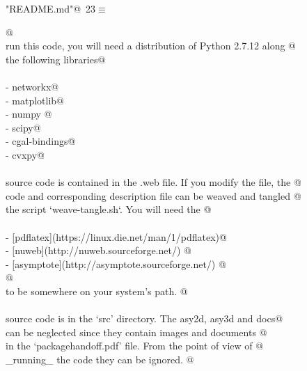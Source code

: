 \documentclass[10pt, english, oneside]{report}
\begin{document}
\begin{appendices}
\begin{flushleft} \small\label{scrap22}\raggedright\small
{} \verb@"README.md"@\nobreak\ {\footnotesize {23}}$\equiv$
\vspace{-1ex}
\begin{list}{}{} \item
\mbox{}\verb@    @\\
\mbox{}\verb@To run this code, you will need a distribution of Python 2.7.12 along @\\
\mbox{}\verb@with the following libraries@\\
\mbox{}\verb@@\\
\mbox{}\verb@- networkx@\\
\mbox{}\verb@- matplotlib@\\
\mbox{}\verb@- numpy @\\
\mbox{}\verb@- scipy@\\
\mbox{}\verb@- cgal-bindings@\\
\mbox{}\verb@- cvxpy@\\
\mbox{}\verb@@\\
\mbox{}\verb@All source code is contained in the .web file. If you modify the file, the @\\
\mbox{}\verb@resulting code and corresponding description file can be weaved and tangled @\\
\mbox{}\verb@with the script `weave-tangle.sh`. You will need the @\\
\mbox{}\verb@@\\
\mbox{}\verb@- [pdflatex](https://linux.die.net/man/1/pdflatex)@\\
\mbox{}\verb@- [nuweb](http://nuweb.sourceforge.net/) @\\
\mbox{}\verb@- [asymptote](http://asymptote.sourceforge.net/) @\\
\mbox{}\verb@  @\\
\mbox{}\verb@executables to be somewhere on your system's path. @\\
\mbox{}\verb@@\\
\mbox{}\verb@All source code is in the `src' directory. The asy2d, asy3d and docs@\\
\mbox{}\verb@folders can be neglected since they contain images and documents @\\
\mbox{}\verb@referenced in the `packagehandoff.pdf' file. From the point of view of @\\
\mbox{}\verb@_running_ the code they can be ignored. @\\
\mbox{}\verb@@\\
\mbox{}\verb@@\\
\mbox{}\verb@@\\
\mbox{}\verb@@{\NWsep}
\end{list}
\vspace{-1.5ex}
\footnotesize
\begin{list}{}{\setlength{\itemsep}{-\parsep}\setlength{\itemindent}{-\leftmargin}}


\end{list}
\end{flushleft}
\end{appendices}
\end{document}
